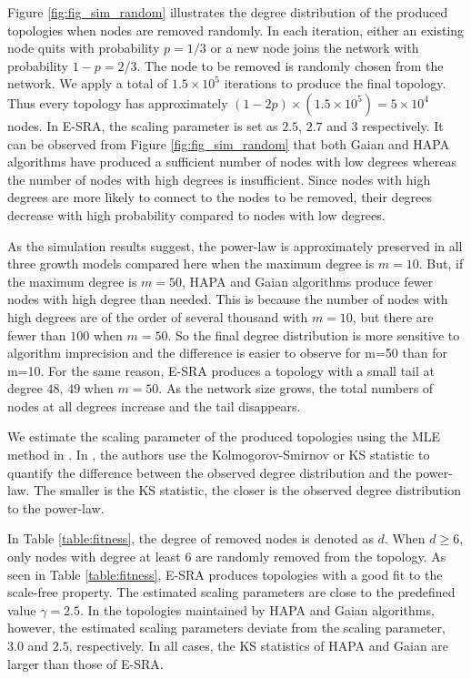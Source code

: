 Figure \ref{fig:fig_sim_random} illustrates the degree distribution of the produced topologies when nodes are removed randomly. In each iteration, either an existing node quits with probability $p = 1/3$ or a new node joins the network with probability $1-p = 2/3$. The node to be removed is randomly chosen from the network. We apply a total of $1.5 \times 10^5$ iterations to produce the final topology. Thus every topology has approximately $(1-2p) \times (1.5 \times 10^5) = 5 \times 10^4$ nodes. In E-SRA, the scaling parameter is set as $2.5$, $2.7$ and $3$ respectively. It can be observed from Figure \ref{fig:fig_sim_random} that both Gaian and HAPA algorithms have produced a sufficient number of nodes with low degrees whereas the number of nodes with high degrees is insufficient. Since nodes with high degrees are more likely to connect to the nodes to be removed, their degrees decrease with high probability compared to nodes with low degrees. 

As the simulation results suggest, the power-law is approximately preserved in all three growth models compared here when the maximum degree is $m=10$. But, if the maximum degree is $m=50$, HAPA and Gaian algorithms produce fewer nodes with high degree than needed. This is because the number of nodes with high degrees are of the order of several thousand with $m=10$, but there are fewer than $100$ when $m=50$. So the final degree distribution is more sensitive to algorithm imprecision and the difference is easier to observe for m=50 than for m=10. For the same reason, E-SRA produces a topology with a small tail at degree $48$, $49$ when $m=50$. As the network size grows, the total numbers of nodes at all degrees increase and the tail disappears.

We estimate the scaling parameter of the produced topologies using the MLE method in \cite{clauset2009power}. In \cite{clauset2009power}, the authors use the Kolmogorov-Smirnov
or KS statistic to quantify the difference between the observed degree distribution and the power-law. The smaller is the KS statistic, the closer is the observed degree distribution to the power-law.

In Table \ref{table:fitness}, the degree of removed nodes is denoted as $d$. When $d\geq6$, only nodes with degree at least 6 are randomly removed from the topology. As seen in Table \ref{table:fitness}, E-SRA produces topologies with a good fit to the scale-free property. The estimated scaling parameters are close to the predefined value $\gamma=2.5$. In the topologies maintained by HAPA and Gaian algorithms, however, the estimated scaling parameters deviate from the scaling parameter, $3.0$ and $2.5$, respectively. In all cases, the KS statistics of HAPA and Gaian are larger than those of E-SRA.

